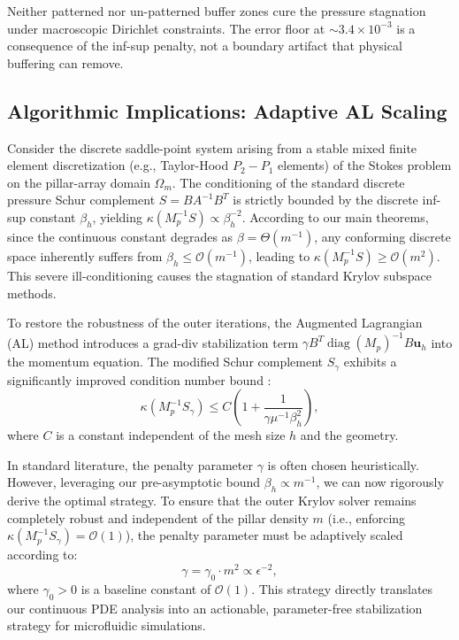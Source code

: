 \documentclass{elsarticle}
\begin{document}
Neither patterned nor un-patterned buffer zones cure the pressure stagnation under macroscopic Dirichlet constraints. The error floor at $\sim 3.4 \times 10^{-3}$ is a consequence of the inf-sup penalty, not a boundary artifact that physical buffering can remove.



\subsection{Algorithmic Implications: Adaptive AL Scaling}\label{subsec:al_scaling}

Consider the discrete saddle-point system arising from a stable mixed finite element discretization (e.g., Taylor-Hood $P_2-P_1$ elements) of the Stokes problem on the pillar-array domain $\Omega_m$. The conditioning of the standard discrete pressure Schur complement $S = B A^{-1} B^T$ is strictly bounded by the discrete inf-sup constant $\beta_h$, yielding $\kappa(M_p^{-1} S) \propto \beta_h^{-2}$. According to our main theorems, since the continuous constant degrades as $\beta = \Theta(m^{-1})$, any conforming discrete space inherently suffers from $\beta_h \le \mathcal{O}(m^{-1})$, leading to $\kappa(M_p^{-1}S) \ge \mathcal{O}(m^2)$. This severe ill-conditioning causes the stagnation of standard Krylov subspace methods.

To restore the robustness of the outer iterations, the Augmented Lagrangian (AL) method introduces a grad-div stabilization term $\gamma B^T \operatorname{diag}(M_p)^{-1} B \mathbf{u}_h$ into the momentum equation. The modified Schur complement $S_{\gamma}$ exhibits a significantly improved condition number bound \cite{Benzi2006}:
\begin{equation}\label{eq:al_condition_bound}
    \kappa(M_p^{-1}S_{\gamma}) \le C \left( 1 + \frac{1}{\gamma \mu^{-1} \beta_h^2} \right),
\end{equation}
where $C$ is a constant independent of the mesh size $h$ and the geometry.

In standard literature, the penalty parameter $\gamma$ is often chosen heuristically. However, leveraging our pre-asymptotic bound $\beta_h \propto m^{-1}$, we can now rigorously derive the optimal strategy. To ensure that the outer Krylov solver remains completely robust and independent of the pillar density $m$ (i.e., enforcing $\kappa(M_p^{-1}S_{\gamma}) = \mathcal{O}(1)$), the penalty parameter must be adaptively scaled according to:
\begin{equation}\label{eq:gamma_scaling}
    \gamma = \gamma_0 \cdot m^2 \propto \epsilon^{-2},
\end{equation}
where $\gamma_0 > 0$ is a baseline constant of $\mathcal{O}(1)$. This strategy directly translates our continuous PDE analysis into an actionable, parameter-free stabilization strategy for microfluidic simulations.
\end{document}
